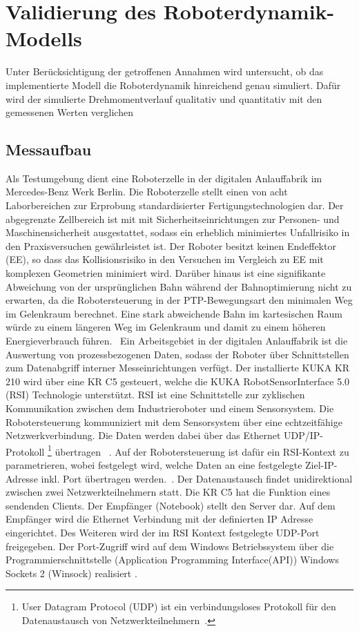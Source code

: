 \chapter{Validierung des Roboterdynamik-Modells}
\label{sec:modellvalidierung}
%
Unter Berücksichtigung der getroffenen Annahmen wird untersucht, ob das implementierte Modell die Roboterdynamik hinreichend genau simuliert. Dafür wird der simulierte Drehmomentverlauf qualitativ und quantitativ mit den gemessenen Werten verglichen
%
\section{Messaufbau}
Als Testumgebung dient eine Roboterzelle in der digitalen Anlauffabrik im Mercedes-Benz Werk Berlin.
Die Roboterzelle stellt einen von acht Laborbereichen zur Erprobung standardisierter Fertigungstechnologien dar.  Der abgegrenzte Zellbereich ist mit mit Sicherheitseinrichtungen zur Personen- und Maschinensicherheit ausgestattet, sodass ein erheblich minimiertes Unfallrisiko in den Praxisversuchen gewährleistet ist. Der Roboter besitzt keinen Endeffektor (EE), so dass das Kollisionsrisiko in den Versuchen im Vergleich zu EE mit komplexen Geometrien minimiert wird. Darüber hinaus ist eine signifikante Abweichung von der ursprünglichen Bahn während der Bahnoptimierung nicht zu erwarten, da die Robotersteuerung in der PTP-Bewegungsart den minimalen Weg im Gelenkraum berechnet. Eine stark abweichende Bahn im kartesischen Raum würde zu einem längeren Weg im Gelenkraum und damit zu einem höheren Energieverbrauch führen.~\cite[S.~59]{Eggers.2019}
%
Ein Arbeitsgebiet in der digitalen Anlauffabrik ist die Auswertung von prozessbezogenen Daten, sodass der Roboter über Schnittstellen zum Datenabgriff interner Messeinrichtungen verfügt. Der installierte KUKA KR 210 wird über eine KR C5 gesteuert, welche die KUKA RobotSensorInterface 5.0 (RSI) Technologie unterstützt. RSI ist eine Schnittstelle zur zyklischen Kommunikation zwischen dem Industrieroboter und einem Sensorsystem. Die Robotersteuerung kommuniziert mit dem Sensorsystem über eine echtzeitfähige Netzwerkverbindung. Die Daten werden dabei über das Ethernet UDP/IP-Protokoll \footnote{User Datagram Protocol (UDP) ist ein verbindungsloses Protokoll für den Datenaustausch von Netzwerkteilnehmern~\cite{RSI.2020}.} übertragen ~\cite[S.~11]{RSI.2020}. 
Auf der Robotersteuerung ist daf{\"u}r ein RSI-Kontext zu parametrieren, wobei festgelegt wird, welche Daten an eine festgelegte Ziel-IP-Adresse inkl. Port {\"u}bertragen werden.~\cite[S.~43]{RSI.2020}.  Der Datenaustausch findet unidirektional zwischen zwei Netzwerkteilnehmern statt. Die KR C5 hat die Funktion eines sendenden Clients. Der Empfänger (Notebook) stellt den Server dar. Auf dem Empfänger wird die Ethernet Verbindung mit der definierten IP Adresse eingerichtet. Des Weiteren wird der im RSI Kontext festgelegte UDP-Port freigegeben. Der Port-Zugriff wird auf dem Windows Betriebssystem über die Programmierschnittstelle (Application Programming Interface(API)) Windows Sockets 2 (Winsock) realisiert \cite{Winsock.2023}. 
